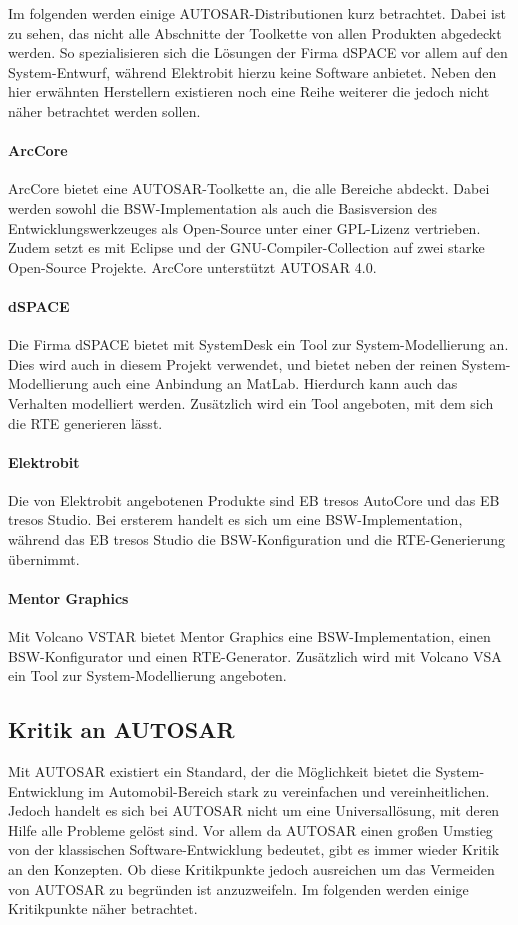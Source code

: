 \documentclass[
  a4paper,					    %
  twoside,
  DIV=calc,     				%
  bibliography=totoc,
  cleardoublepage=empty,
  ngerman,     					%
  final       					%
]{scrbook}
\begin{document}
Im folgenden werden einige AUTOSAR-Distributionen kurz betrachtet\cite{wiki:autosar}. Dabei ist zu sehen, das nicht alle Abschnitte der Toolkette von allen Produkten abgedeckt werden. So spezialisieren sich die Lösungen der Firma dSPACE vor allem auf den System-Entwurf, während Elektrobit hierzu keine Software anbietet. Neben den hier erwähnten Herstellern existieren noch eine Reihe weiterer die jedoch nicht näher betrachtet werden sollen.

\paragraph{ArcCore}
ArcCore bietet eine AUTOSAR-Toolkette an, die alle Bereiche abdeckt. Dabei werden sowohl die BSW-Implementation als auch die Basisversion des Entwicklungswerkzeuges als Open-Source unter einer GPL-Lizenz vertrieben. Zudem setzt es mit Eclipse und der GNU-Compiler-Collection auf zwei starke Open-Source Projekte. ArcCore unterstützt AUTOSAR 4.0.

\paragraph{dSPACE}
Die Firma dSPACE bietet mit SystemDesk ein Tool zur System-Modellierung an. Dies wird auch in diesem Projekt verwendet, und bietet neben der reinen System-Modellierung auch eine Anbindung an MatLab. Hierdurch kann auch das Verhalten modelliert werden. Zusätzlich wird ein Tool angeboten, mit dem sich die RTE generieren lässt.

\paragraph{Elektrobit}
Die von Elektrobit angebotenen Produkte sind EB tresos AutoCore und das EB tresos Studio. Bei ersterem handelt es sich um eine BSW-Implementation, während das EB tresos Studio die BSW-Konfiguration und die RTE-Generierung übernimmt.

\paragraph{Mentor Graphics}
Mit Volcano VSTAR bietet Mentor Graphics eine BSW-Implementation, einen BSW-Konfigurator und einen RTE-Generator. Zusätzlich wird mit Volcano VSA ein Tool zur System-Modellierung angeboten.




\subsection{Kritik an AUTOSAR}
\label{sec:kritik_autosar}
Mit AUTOSAR existiert ein Standard, der die Möglichkeit bietet die System-Entwicklung im Automobil-Bereich stark zu vereinfachen und vereinheitlichen. Jedoch handelt es sich bei AUTOSAR nicht um eine Universallösung, mit deren Hilfe alle Probleme gelöst sind. Vor allem da AUTOSAR einen großen Umstieg von der klassischen Software-Entwicklung bedeutet, gibt es immer wieder Kritik an den Konzepten. Ob diese Kritikpunkte jedoch ausreichen um das Vermeiden von AUTOSAR zu begründen ist anzuzweifeln. Im folgenden werden einige Kritikpunkte näher betrachtet.
\end{document}
